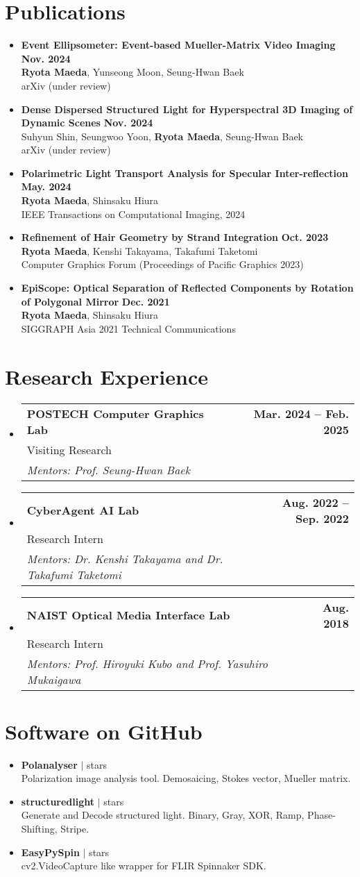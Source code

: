 \documentclass[letterpaper,11pt]{article}
\makeatletter
\newcommand{\resumeSubheadingWithAdvisor}[4]{
  \vspace{-2pt}\item
    \begin{tabular*}{1.0\textwidth}[t]{l@{\extracolsep{\fill}}r}
      \textbf{#1} & \textbf{\small #2} \\
      {\small#3} &  \\
      \textit{\small#4} &  \\
    \end{tabular*}\vspace{-7pt}
}
\newcommand{\resumePublicationHeading}[4]{
    \item 
    \small 
    \textbf{#1} \hfill \textbf{#2}\\
    #3\\
    #4 
}
\newcommand{\resumeSoftwareHeading}[3]{
    \item 
    \small 
    \textbf{#1} $|$ \raisebox{0.09\height}{\scriptsize \faIcon[regular]{star}\hspace{0.5ex}}#2 stars\\
    #3 
}
\newcommand{\resumeSubHeadingListStart}{\begin{itemize}[leftmargin=0.0in, label={}]}
\newcommand{\resumeSubHeadingListEnd}{\end{itemize}}
\makeatother
\begin{document}
\section{Publications}
    \resumeSubHeadingListStart
        \resumePublicationHeading
            {Event Ellipsometer: Event-based Mueller-Matrix Video Imaging}{Nov. 2024}
            {\textbf{Ryota Maeda}, Yunseong Moon, Seung-Hwan Baek}
            {arXiv (under review)}
        \resumePublicationHeading
            {Dense Dispersed Structured Light for Hyperspectral 3D Imaging of Dynamic Scenes}{Nov. 2024}
            {Suhyun Shin, Seungwoo Yoon, \textbf{Ryota Maeda}, Seung-Hwan Baek}
            {arXiv (under review)}
        \resumePublicationHeading
            {Polarimetric Light Transport Analysis for Specular Inter-reflection}{May. 2024}
            {\textbf{Ryota Maeda}, Shinsaku Hiura}
            {IEEE Transactions on Computational Imaging, 2024}
        \resumePublicationHeading
            {Refinement of Hair Geometry by Strand Integration}{Oct. 2023}
            {\textbf{Ryota Maeda}, Kenshi Takayama, Takafumi Taketomi}
            {Computer Graphics Forum (Proceedings of Pacific Graphics 2023)}
        \resumePublicationHeading
            {EpiScope: Optical Separation of Reflected Components by Rotation of Polygonal Mirror}{Dec. 2021}
            {\textbf{Ryota Maeda}, Shinsaku Hiura}
            {SIGGRAPH Asia 2021 Technical Communications}
    \resumeSubHeadingListEnd

\section{Research Experience}
    \resumeSubHeadingListStart
        \resumeSubheadingWithAdvisor
            {POSTECH Computer Graphics Lab}{Mar. 2024 -- Feb. 2025}
            {Visiting Research}
            {Mentors: Prof. Seung-Hwan Baek}
        \resumeSubheadingWithAdvisor
            {CyberAgent AI Lab}{Aug. 2022 -- Sep. 2022}
            {Research Intern}
            {Mentors: Dr. Kenshi Takayama and Dr. Takafumi Taketomi}
        \resumeSubheadingWithAdvisor
            {NAIST Optical Media Interface Lab}{Aug. 2018}
            {Research Intern}
            {Mentors: Prof. Hiroyuki Kubo and Prof. Yasuhiro Mukaigawa}
    \resumeSubHeadingListEnd

\section{Software on GitHub}
    \resumeSubHeadingListStart
        \resumeSoftwareHeading
            {Polanalyser}{}
            {Polarization image analysis tool. Demosaicing, Stokes vector, Mueller matrix.}
        \resumeSoftwareHeading
            {structuredlight}{}
            {Generate and Decode structured light. Binary, Gray, XOR, Ramp, Phase-Shifting, Stripe.}
        \resumeSoftwareHeading
            {EasyPySpin}{}
            {cv2.VideoCapture like wrapper for FLIR Spinnaker SDK.}
    \resumeSubHeadingListEnd
\vspace{-15pt}
\end{document}
